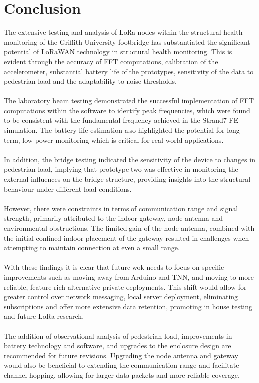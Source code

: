 \section{Conclusion}
The extensive testing and analysis of LoRa nodes within the structural health monitoring of the Griffith University footbridge has substantiated the significant potential of LoRaWAN technology in structural health monitoring. This is evident through the accuracy of FFT computations, calibration of the accelerometer, substantial battery life of the prototypes, sensitivity of the data to pedestrian load and the adaptability to noise thresholds.\\\\
The laboratory beam testing demonstrated the successful implementation of FFT computations within the software to identify peak frequencies, which were found to be consistent with the fundamental frequency achieved in the Strand7 FE simulation. The battery life estimation also highlighted the potential for long-term, low-power monitoring which is critical for real-world applications.\\\\
In addition, the bridge testing indicated the sensitivity of the device to changes in pedestrian load, implying that prototype two was effective in monitoring the external influences on the bridge structure, providing insights into the structural behaviour under different load conditions.\\\\
However, there were constraints in terms of communication range and signal strength, primarily attributed to the indoor gateway, node antenna and environmental obstructions. The limited gain of the node antenna, combined with the initial confined indoor placement of the gateway resulted in challenges when attempting to maintain connection at even a small range.\\\\
With these findings it is clear that future wok needs to focus on specific improvements such as moving away from Arduino and TNN, and moving to more reliable, feature-rich alternative private deployments. This shift would allow for greater control over network messaging, local server deployment, eliminating subscriptions and offer more extensive data retention, promoting in house testing and future LoRa research.\\\\
The addition of observational analysis of pedestrian load, improvements in battery technology and software, and upgrades to the enclosure design are recommended for future revisions. Upgrading the node antenna and gateway would also be beneficial to extending the communication range and facilitate channel hopping, allowing for larger data packets and more reliable coverage.\\\\
